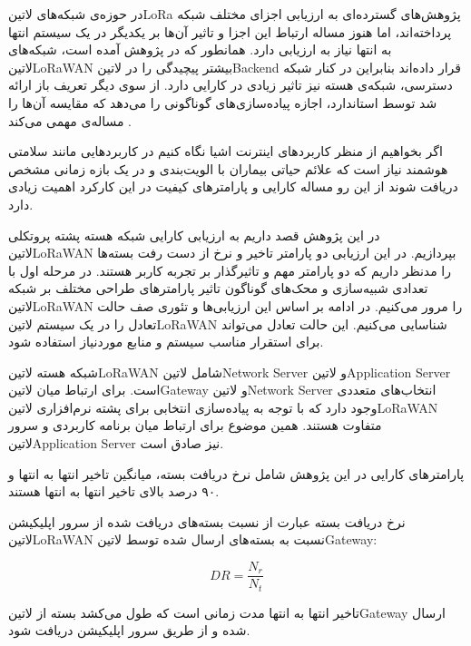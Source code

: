 
در حوزه‌ی شبکه‌های ‌لاتین{LoRa} پژوهش‌های گسترده‌ای به ارزیابی اجزای مختلف شبکه پرداخته‌اند، اما هنوز
مساله ارتباط این اجزا و تاثیر آن‌ها بر یکدیگر در یک سیستم انتها به انتها نیاز به ارزیابی دارد.
همانطور که در پژوهش  آمده است، شبکه‌های ‌لاتین{LoRaWAN} بیشتر پیچیدگی را
در ‌لاتین{Backend} قرار داده‌اند بنابراین در کنار شبکه دسترسی، شبکه‌ی هسته نیز تاثیر زیادی در کارایی دارد.
از سوی دیگر تعریف باز ارائه شد توسط استاندارد، اجازه پیاده‌سازی‌های گوناگونی را می‌دهد که مقایسه آن‌ها را مساله‌ی مهمی می‌کند
.

اگر بخواهیم از منظر کاربردهای اینترنت اشیا نگاه کنیم در کاربردهایی مانند سلامتی هوشمند نیاز است که علائم حیاتی بیماران
با الویت‌بندی و در یک بازه زمانی مشخص دریافت شوند از این رو مساله کارایی و پارامترهای کیفیت در این کارکرد اهمیت زیادی
دارد.


در این پژوهش قصد داریم به ارزیابی کارایی شبکه هسته پشته پروتکلی ‌لاتین{LoRaWAN}
بپردازیم. در این ارزیابی دو پارامتر تاخیر و نرخ از دست رفت بسته‌ها را مدنظر داریم که دو پارامتر مهم
و تاثیرگذار بر تجربه کاربر هستند.
در مرحله اول با تعدادی شبیه‌سازی و محک‌های گوناگون تاثیر پارامترهای طراحی مختلف بر شبکه ‌لاتین{LoRaWAN}
را مرور می‌کنیم.
در ادامه بر اساس این ارزیابی‌ها و تئوری صف حالت تعادل را در یک سیستم ‌لاتین{LoRaWAN} شناسایی می‌کنیم.
این حالت تعادل می‌تواند برای استقرار مناسب سیستم و منابع موردنیاز استفاده شود.

شبکه هسته ‌لاتین{LoRaWAN} شامل ‌لاتین{Network Server} و ‌لاتین{Application Server} است.
برای ارتباط میان ‌لاتین{Gateway} و ‌لاتین{Network Server} انتخاب‌های متعددی وجود دارد که با توجه به پیاده‌سازی
انتخابی برای پشته نرم‌افزاری ‌لاتین{LoRaWAN} متفاوت هستند. همین موضوع برای ارتباط میان برنامه کاربردی و سرور
‌لاتین{Application Server} نیز صادق است.

پارامترهای کارایی در این پژوهش شامل نرخ دریافت بسته، میانگین تاخیر انتها به انتها و ۹۰ درصد بالای تاخیر انتها به انتها
هستند.

نرخ دریافت بسته عبارت از نسبت بسته‌های دریافت شده از سرور اپلیکیشن ‌لاتین{LoRaWAN}
نسبت به بسته‌های ارسال شده توسط ‌لاتین{Gateway}:

\[
  DR = \frac{N_{r}}{N_{t}}
\]

تاخیر انتها به انتها مدت زمانی است که طول می‌کشد بسته از ‌لاتین{Gateway} ارسال شده
و از طریق سرور اپلیکیشن دریافت شود.

